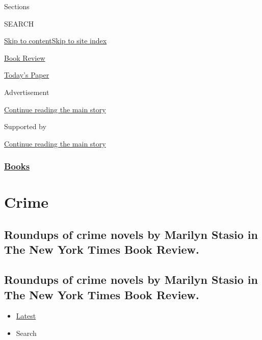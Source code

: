Sections

SEARCH

\protect\hyperlink{site-content}{Skip to
content}\protect\hyperlink{site-index}{Skip to site index}

\href{https://www.nytimes3xbfgragh.onion/section/books/review}{Book
Review}

\href{https://myaccount.nytimes3xbfgragh.onion/auth/login?response_type=cookie\&client_id=vi}{}

\href{https://www.nytimes3xbfgragh.onion/section/todayspaper}{Today's
Paper}

Advertisement

\protect\hyperlink{after-top}{Continue reading the main story}

Supported by

\protect\hyperlink{after-sponsor}{Continue reading the main story}

\hypertarget{books}{%
\subsubsection{\texorpdfstring{\href{/section/books}{Books}}{Books}}\label{books}}

\hypertarget{crime}{%
\section{Crime}\label{crime}}

\hypertarget{roundups-of-crime-novels-by-marilyn-stasio-in-the-new-york-times-book-review}{%
\subsection{Roundups of crime novels by Marilyn Stasio in The New York
Times Book
Review.}\label{roundups-of-crime-novels-by-marilyn-stasio-in-the-new-york-times-book-review}}

\hypertarget{roundups-of-crime-novels-by-marilyn-stasio-in-the-new-york-times-book-review-1}{%
\subsection{Roundups of crime novels by Marilyn Stasio in The New York
Times Book
Review.}\label{roundups-of-crime-novels-by-marilyn-stasio-in-the-new-york-times-book-review-1}}

\begin{itemize}
\tightlist
\item
  \protect\hyperlink{stream-panel}{Latest}
\item
  Search
\end{itemize}

